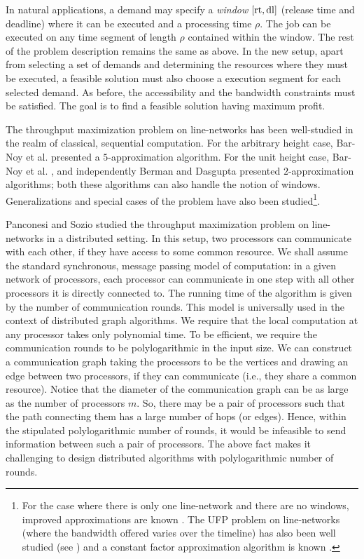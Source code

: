 \documentclass[11pt]{article}
\newcommand{\rt} {{\rm rt}}
\newcommand{\dl} {{\rm dl}}
\begin{document}
In natural applications, a demand may specify a {\em window} 
$[\rt,\dl]$ (release time and deadline) where it can be executed and a processing time $\rho$.
The job can be executed on any time segment of length $\rho$ contained within the window.
The rest of the problem description remains the same as above.
In the new setup, apart from selecting a set of demands and determining the resources where they must be executed,
a feasible solution must also choose a execution segment for each selected demand.
As before, the accessibility and the bandwidth constraints must be satisfied.
The goal is to find a feasible solution having maximum profit.

The throughput maximization problem on line-networks 
has been well-studied in the realm of classical, sequential computation. 
For the arbitrary height case, Bar-Noy et al. \cite{Bar-Noy-Jacm} presented a $5$-approximation algorithm.
For the unit height case, Bar-Noy et al. \cite{Bar-Noy-Jacm}, and independently Berman and Dasgupta \cite{BermanDasgupta}
presented $2$-approximation algorithms; both these algorithms can also handle the notion of windows.
Generalizations and special cases of the problem have also been studied\footnote{
For the case where there is only one line-network and there are no windows,
improved approximations are known \cite{Bar-Noy-Jacm,Calinescu}.
The UFP problem on line-networks (where the bandwidth offered varies over the timeline)
has also been well studied (see \cite{Bansal1,Bansal2,our-ipdps,AmitKumar,ChekuriUFP})
and a constant factor approximation algorithm is known \cite{Bonsma}.
}.

Panconesi and Sozio \cite{Pancc,Pancj} studied the throughput maximization problem on line-networks 
in a distributed setting. In this setup, two processors can communicate with each other, 
if they have access to some common resource.
We shall assume the standard synchronous, message passing model of computation:
in a given network of processors, each processor can communicate in one step with all
other processors it is directly connected to. The running time of the algorithm is given
by the number of communication rounds. This model is universally used in the context
of distributed graph algorithms. We require that the local computation at any processor
takes only polynomial time. To be efficient, we require the communication rounds
to be polylogarithmic in the input size. 
We can construct a communication graph taking the processors to be the vertices
and drawing an edge between two processors, if they can communicate (i.e., they share a common resource).
Notice that the diameter of the communication graph can be as large
as the number of processors $m$. 
So, there may be a pair of processors such that the path connecting them has a large number of hops (or edges).
Hence, within the stipulated polylogarithmic number of rounds, it would be infeasible to
send information between such a pair of processors.
The above fact makes it challenging to design distributed algorithms with polylogarithmic number of rounds.
\end{document}

